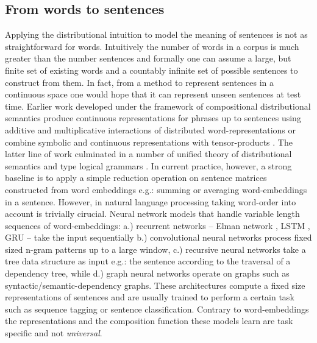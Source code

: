 \subsection{From words to sentences}
\label{sec:sentences}
Applying the distributional intuition to model the meaning of sentences is not as straightforward for words.
Intuitively the number of words in a corpus is much greater than the number sentences and formally
one can assume a large, but finite set of existing words and a countably infinite set of possible sentences to
construct from them.
In fact, from a method to represent sentences in a continuous space one would hope that it can represent
unseen sentences at test time.
Earlier work developed under the framework of compositional distributional semantics produce continuous representations
for phrases up to sentences using additive and multiplicative interactions of distributed
word-representations \cite{mitchell2008vector} or combine symbolic and continuous representations with
tensor-products \cite{clark2007combining}. The latter line of work culminated in a number of unified theory of
distributional semantics and type logical grammars \cite{coecke2010mathematical,clarke2012context,baroni2014frege}.
In current practice, however, a strong baseline is to apply
a simple reduction operation on sentence matrices constructed from word embeddings
e.g.: summing or averaging word-embeddings in a sentence.
However, in natural language processing taking word-order into account is trivially cirucial.
Neural network models that handle variable length sequences of word-embeddings: a.)
recurrent networks -- Elman network \cite{elman1991distributed}, LSTM \cite{hochreiter1997long},
GRU \cite{cho2014properties} -- take the input sequentially b.) convolutional neural networks
\cite{kalchbrenner2014convolutional,zhang2015character,conneau2016very,chen2013learning} process fixed sized
n-gram patterns up to a large window, c.) recursive neural networks \cite{goller1996learning.socher2011parsing,tai2015improved}
take a tree data structure as input e.g.: the sentence according to the traversal of a dependency tree, while
d.) graph neural networks operate on graphs \cite{marcheggiani2017encoding} such as syntactic/semantic-dependency graphs.
These architectures compute a fixed size representations of sentences and are usually trained to perform a certain
task such as sequence tagging or sentence classification. Contrary to word-embeddings the representations
and the composition function these models learn are task specific and not \emph{universal}.
